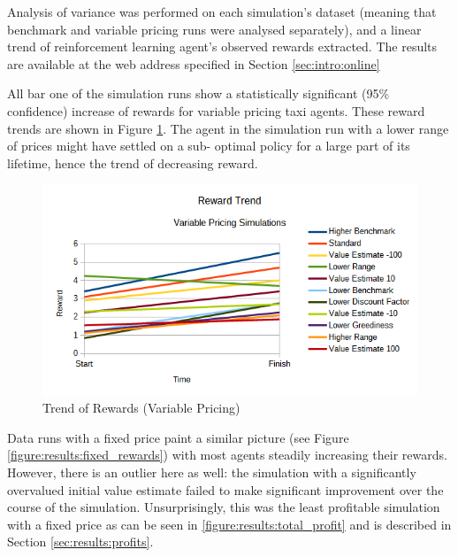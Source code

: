 Analysis of variance was performed on each simulation's dataset (meaning that
benchmark and variable pricing runs were analysed separately), and a linear
trend of reinforcement learning agent's observed rewards extracted. The results
are available at the web address specified in Section \ref{sec:intro:online}

All bar one of the simulation runs show a statistically significant (95\%
confidence) increase of rewards for variable pricing taxi agents. These reward
trends are shown in Figure \ref{figure:results:variable_rewards}. The agent in
the simulation run with a lower range of prices might have settled on a sub-
optimal policy for a large part of its lifetime, hence the trend of decreasing
reward.

\begin{figure}
\begin{center}
  \includegraphics[width=\textwidth]{../figures/reward_trend_variable}
  \caption{
    Trend of Rewards (Variable Pricing)
    \label{figure:results:variable_rewards}
  }
\end{center}
\end{figure}

Data runs with a fixed price paint a similar picture (see Figure
\ref{figure:results:fixed_rewards}) with most agents steadily increasing their
rewards. However, there is an outlier here as well: the simulation with a
significantly overvalued initial value estimate failed to make significant
improvement over the course of the simulation. Unsurprisingly, this was the
least profitable simulation with a fixed price as can be seen in
\ref{figure:results:total_profit} and is described in Section
\ref{sec:results:profits}.

